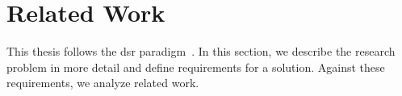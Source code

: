 \section{Related Work }
\label{sec:bpm2017background}
This thesis follows the \gls{dsr} paradigm~\cite{Peffers2008}. In this section, we describe the research problem in more detail and define requirements for a solution. Against these requirements, we analyze related work.

%



%
